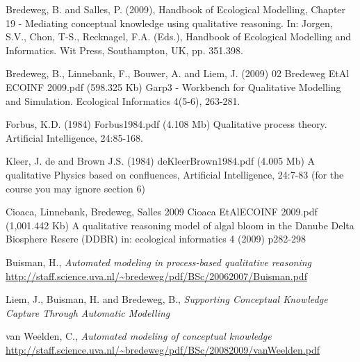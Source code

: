 \documentclass{article}
\begin{document}
\begin{thebibliography}{99}


 Bredeweg, B. and Salles, P. (2009), Handbook of Ecological Modelling, Chapter 19 - Mediating conceptual knowledge using qualitative reasoning. In: J\/orgen, S.V., Chon, T-S., Recknagel, F.A. (Eds.), Handbook of Ecological Modelling and Informatics. Wit Press, Southampton, UK, pp. 351.398.

 Bredeweg, B., Linnebank, F., Bouwer, A. and Liem, J. (2009)
02 Bredeweg EtAl ECOINF 2009.pdf (598.325 Kb)
Garp3 - Workbench for Qualitative Modelling and Simulation. Ecological Informatics 4(5-6), 263-281.

 Forbus, K.D. (1984)
Forbus1984.pdf (4.108 Mb)
Qualitative process theory. Artificial Intelligence, 24:85-168. 

 Kleer, J. de and Brown J.S. (1984)
deKleerBrown1984.pdf (4.005 Mb)
A qualitative Physics based on confluences, Artificial Intelligence, 24:7-83 (for the course you may ignore section 6)

 Cioaca, Linnebank, Bredeweg, Salles 2009
Cioaca EtAlECOINF 2009.pdf (1,001.442 Kb)
A qualitative reasoning model of algal bloom in the Danube Delta Biosphere Resere (DDBR)
in: ecological informatics 4 (2009) p282-298

 Buisman, H., \emph{Automated modeling in process-based qualitative reasoning} \url{http://staff.science.uva.nl/~bredeweg/pdf/BSc/20062007/Buisman.pdf}

 Liem, J., Buisman, H. and Bredeweg, B., \emph{Supporting Conceptual Knowledge Capture Through Automatic Modelling}

 van Weelden, C., \emph{Automated modeling of conceptual knowledge} \url{http://staff.science.uva.nl/~bredeweg/pdf/BSc/20082009/vanWeelden.pdf}

\end{thebibliography}
\end{document}
